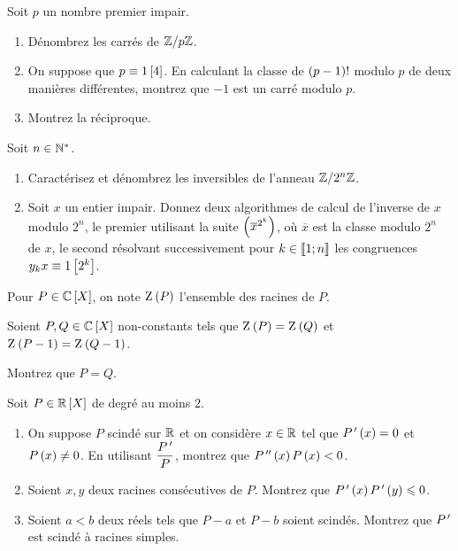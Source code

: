 \begin{exo}
Soit \(p\) un nombre premier impair.

\begin{enumerate}
    \item Dénombrez les carrés de \(\mathbb{Z}/p\mathbb{Z}\). \\
    \item On suppose que \(p\equiv1\left[4\right]\). En calculant la classe de \(\left(p-1\right)!\) modulo \(p\) de deux manières différentes, montrez que \(-1\) est un carré modulo \(p\). \\
    \item Montrez la réciproque.
\end{enumerate}
\end{exo}

\begin{exo}
Soit \(n\in\mathbb{N}^*\).

\begin{enumerate}
    \item Caractérisez et dénombrez les inversibles de l'anneau \(\mathbb{Z}/2^n\mathbb{Z}\). \\
    \item Soit \(x\) un entier impair. Donnez deux algorithmes de calcul de l'inverse de \(x\) modulo \(2^n\), le premier utilisant la suite \(\left(\overline{x}^{2^k}\right)\), où \(\overline{x}\) est la classe modulo \(2^n\) de \(x\), le second résolvant successivement pour \(k\in\left\llbracket1;n\right\rrbracket\) les congruences \(y_kx\equiv1\left[2^k\right]\).
\end{enumerate}
\end{exo}

\begin{exo}
Pour \(P\in\poly[\C]\), on note \(\rac[]{P}\) l'ensemble des racines de \(P\).

Soient \(P,Q\in\poly[\C]\) non-constants tels que \(\rac[]{P}=\rac[]{Q}\) et \(\rac[]{P-1}=\rac[]{Q-1}\).

Montrez que \(P=Q\).
\end{exo}

\begin{exo}
Soit \(P\in\poly[\R]\) de degré au moins \(2\).

\begin{enumerate}
    \item On suppose \(P\) scindé sur \(\mathbb{R}\) et on considère \(x\in\mathbb{R}\) tel que \(P^{\,\prime}\left(x\right)=0\) et \(P\left(x\right)\not=0\). En utilisant \(\dfrac{P^{\,\prime}}{P}\), montrez que \(P^{\,\prime\prime}\left(x\right)P\left(x\right)<0\). \\
    \item Soient \(x,y\) deux racines consécutives de \(P\). Montrez que \(P^{\,\prime}\left(x\right)P^{\,\prime}\left(y\right)\leqslant0\). \\
    \item Soient \(a<b\) deux réels tels que \(P-a\) et \(P-b\) soient scindés. Montrez que \(P^{\,\prime}\) est scindé à racines simples.
\end{enumerate}
\end{exo}

